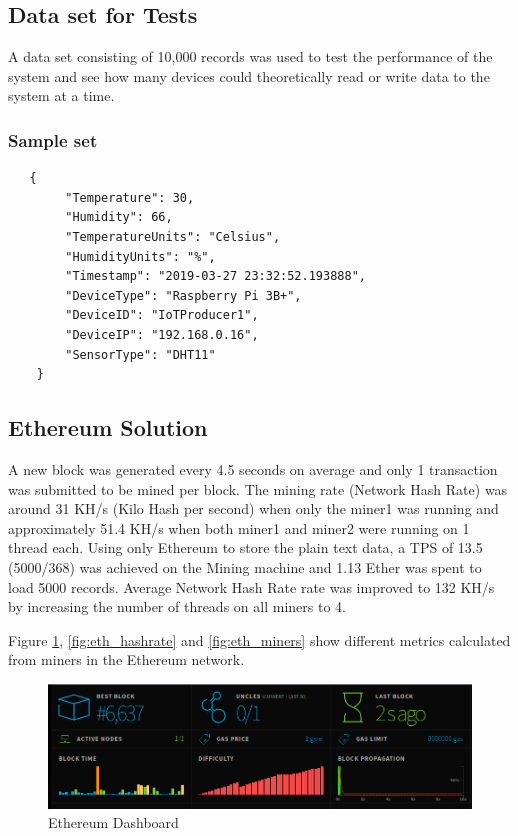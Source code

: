 \documentclass[11pt,openright]{report}
\begin{document}
\subsection{Data set for Tests}
A data set consisting of 10,000 records was used to test the performance of the system and see how many devices could theoretically read or write data to the system at a time.

\subsubsection{Sample set}
\begin{lstlisting}
   {
        "Temperature": 30,
        "Humidity": 66,
        "TemperatureUnits": "Celsius",
        "HumidityUnits": "%",
        "Timestamp": "2019-03-27 23:32:52.193888",
        "DeviceType": "Raspberry Pi 3B+",
        "DeviceID": "IoTProducer1",
        "DeviceIP": "192.168.0.16",
        "SensorType": "DHT11"
    }
\end{lstlisting}

\subsection{Ethereum Solution}
A new block was generated every 4.5 seconds on average and only 1 transaction was submitted to be mined per block. The mining rate (Network Hash Rate) was around 31 KH/s (Kilo Hash per second) when only the miner1 was running and approximately 51.4 KH/s when both miner1 and miner2 were running on 1 thread each. Using only Ethereum to store the plain text data, a TPS of 13.5 (5000/368) was achieved on the Mining machine and 1.13 Ether was spent to load 5000 records. Average Network Hash Rate rate was improved to 132 KH/s by increasing the number of threads on all miners to 4.

Figure \ref{fig:eth_dashboard}, \ref{fig:eth_hashrate} and \ref{fig:eth_miners} show different metrics calculated from miners in the Ethereum network.

\begin{figure}
    \centering
    \includegraphics[scale=0.8]{results/Dashboard.png}
    \caption{Ethereum Dashboard}
    \label{fig:eth_dashboard}
\end{figure}
\end{document}
